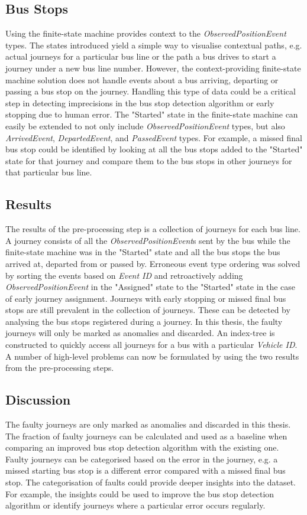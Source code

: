 \subsection{Bus Stops}
Using the finite-state machine provides context to the \textit{ObservedPositionEvent} types.
The states introduced yield a simple way to visualise contextual paths, e.g. actual journeys for a particular bus line or the path a bus drives to start a journey under a new bus line number.
However, the context-providing finite-state machine solution does not handle events about a bus arriving, departing or passing a bus stop on the journey.
Handling this type of data could be a critical step in detecting imprecisions in the bus stop detection algorithm or early stopping due to human error.
The "Started" state in the finite-state machine can easily be extended to not only include \textit{ObservedPositionEvent} types, but also \textit{ArrivedEvent}, \textit{DepartedEvent}, and \textit{PassedEvent} types.
For example, a missed final bus stop could be identified by looking at all the bus stops added to the "Started" state for that journey and compare them to the bus stops in other journeys for that particular bus line.

\subsection{Results}
The results of the pre-processing step is a collection of journeys for each bus line.
A journey consists of all the \textit{ObservedPositionEvent}s sent by the bus while the finite-state machine was in the "Started" state and all the bus stops the bus arrived at, departed from or passed by.
Erroneous event type ordering was solved by sorting the events based on \textit{Event ID} and retroactively adding \textit{ObservedPositionEvent} in the "Assigned" state to the "Started" state in the case of early journey assignment.
Journeys with early stopping or missed final bus stops are still prevalent in the collection of journeys.
These can be detected by analysing the bus stops registered during a journey.
In this thesis, the faulty journeys will only be marked as anomalies and discarded.
An index-tree is constructed to quickly access all journeys for a bus with a particular \textit{Vehicle ID}.
A number of high-level problems can now be formulated by using the two results from the pre-processing steps.

\subsection{Discussion}
The faulty journeys are only marked as anomalies and discarded in this thesis.
The fraction of faulty journeys can be calculated and used as a baseline when comparing an improved bus stop detection algorithm with the existing one.
Faulty journeys can be categorised based on the error in the journey, e.g. a missed starting bus stop is a different error compared with a missed final bus stop.
The categorisation of faults could provide deeper insights into the dataset.
For example, the insights could be used to improve the bus stop detection algorithm or identify journeys where a particular error occurs regularly.    



